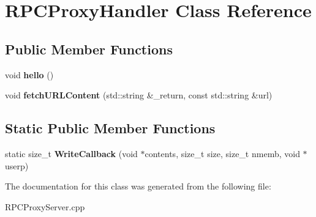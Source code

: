 \hypertarget{classRPCProxyHandler}{\section{\-R\-P\-C\-Proxy\-Handler \-Class \-Reference}
\label{classRPCProxyHandler}
}
\subsection*{\-Public \-Member \-Functions}
\begin{DoxyCompactItemize}
\item 
\hypertarget{classRPCProxyHandler_a13211f85624d234a58ece66412f845ab}{void {\bfseries hello} ()}\label{classRPCProxyHandler_a13211f85624d234a58ece66412f845ab}

\item 
\hypertarget{classRPCProxyHandler_a4b821c2866975f9d686e830df86095a4}{void {\bfseries fetch\-U\-R\-L\-Content} (std\-::string \&\-\_\-return, const std\-::string \&url)}\label{classRPCProxyHandler_a4b821c2866975f9d686e830df86095a4}

\end{DoxyCompactItemize}
\subsection*{\-Static \-Public \-Member \-Functions}
\begin{DoxyCompactItemize}
\item 
\hypertarget{classRPCProxyHandler_a4502c256cc2202280a3626080d2cc3ab}{static size\-\_\-t {\bfseries \-Write\-Callback} (void $\ast$contents, size\-\_\-t size, size\-\_\-t nmemb, void $\ast$userp)}\label{classRPCProxyHandler_a4502c256cc2202280a3626080d2cc3ab}

\end{DoxyCompactItemize}


\-The documentation for this class was generated from the following file\-:\begin{DoxyCompactItemize}
\item 
\-R\-P\-C\-Proxy\-Server.\-cpp\end{DoxyCompactItemize}
